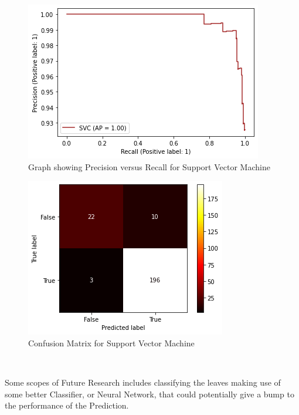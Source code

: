 \documentclass[conference]{IEEEtran}
\begin{document}
\begin{figure}[htbp]
\centerline{\includegraphics[width = \linewidth]{PRC_SVM}}
\label{fig3}
\caption{Graph showing Precision versus Recall for Support Vector Machine}
\end{figure}
\begin{figure}[htbp]
\centerline{\includegraphics[width = \linewidth]{CM_SVM}}
\label{fig4}
\caption{Confusion Matrix for Support Vector Machine}
\end{figure}
\textbf{\\}

Some scopes of Future Research includes classifying the leaves making use of some better Classifier, or Neural Network, that could potentially give a bump to the performance of the Prediction. 
\end{document}
